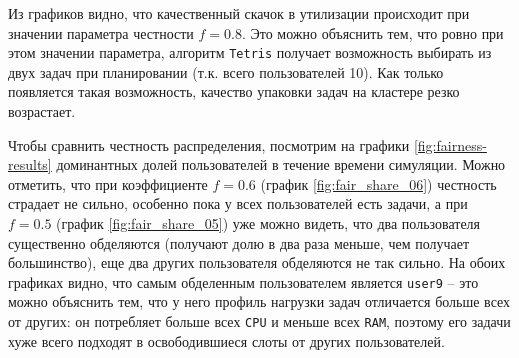 Из графиков видно, что качественный скачок в утилизации происходит при значении параметра честности $f = 0.8$. Это можно объяснить тем, что ровно при этом значении параметра, алгоритм \texttt{Tetris} получает возможность выбирать из двух задач при планировании (т.к. всего пользователей 10). Как только появляется такая возможность, качество упаковки задач на кластере резко возрастает. 

Чтобы сравнить честность распределения, посмотрим на графики \ref{fig:fairness-results} доминантных долей пользователей в течение времени симуляции. Можно отметить, что при коэффициенте $f = 0.6$ (график \ref{fig:fair_share_06}) честность страдает не сильно, особенно пока у всех пользователей есть задачи, а при $f = 0.5$ (график \ref{fig:fair_share_05}) уже можно видеть, что два пользователя существенно обделяются (получают долю в два раза меньше, чем получает большинство), еще два других пользователя обделяются не так сильно.  На обоих графиках видно, что самым обделенным пользователем является \texttt{user9} -- это можно объяснить тем, что у него профиль нагрузки задач отличается больше всех от других: он потребляет больше всех \texttt{CPU} и меньше всех \texttt{RAM}, поэтому его задачи хуже всего подходят в освободившиеся слоты от других пользователей. 


